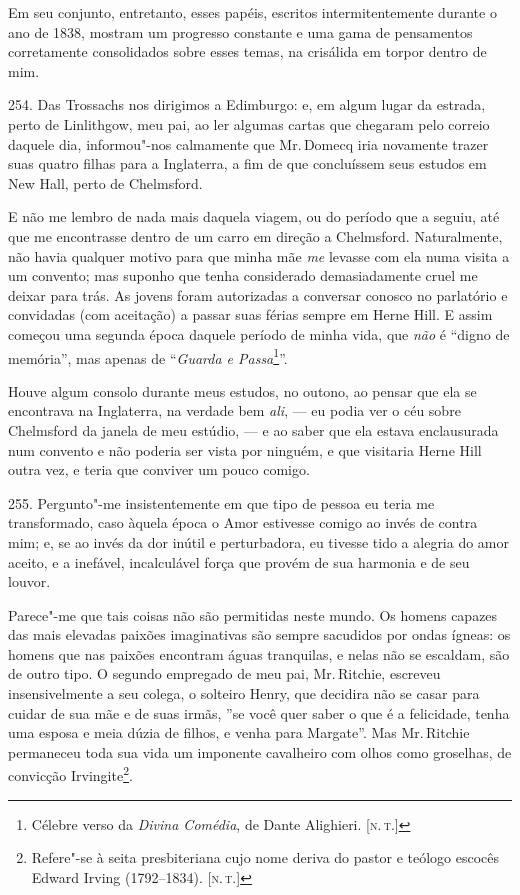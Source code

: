 Em seu conjunto, entretanto, esses papéis, escritos intermitentemente
durante o ano de 1838, mostram um progresso constante e uma gama de
pensamentos corretamente consolidados sobre esses temas, na crisálida em
torpor dentro de mim.

254. Das Trossachs nos dirigimos a Edimburgo: e, em algum lugar da
estrada, perto de Linlithgow, meu pai, ao ler algumas cartas que
chegaram pelo correio daquele dia, informou"-nos calmamente que Mr.\,Domecq
iria novamente trazer suas quatro filhas para a Inglaterra, a fim de que
concluíssem seus estudos em New Hall, perto de Chelmsford.

E não me lembro de nada mais daquela viagem, ou do período que a seguiu,
até que me encontrasse dentro de um carro em direção a Chelmsford.
Naturalmente, não havia qualquer motivo para que minha mãe \emph{me}
levasse com ela numa visita a um convento; mas suponho que tenha
considerado demasiadamente cruel me deixar para trás. As jovens foram
autorizadas a conversar conosco no parlatório e convidadas (com
aceitação) a passar suas férias sempre em Herne Hill. E assim começou
uma segunda época daquele período de minha vida, que \emph{não} é
``digno de memória'', mas apenas de ``\emph{Guarda e Passa}\footnote{Célebre
  verso da \emph{Divina Comédia}, de Dante Alighieri. {[}\textsc{n.\,t.}{]}}''.

Houve algum consolo durante meus estudos, no outono, ao pensar que ela
se encontrava na Inglaterra, na verdade bem \emph{ali}, --- eu podia ver
o céu sobre Chelmsford da janela de meu estúdio, --- e ao saber que ela
estava enclausurada num convento e não poderia ser vista por ninguém, e
que visitaria Herne Hill outra vez, e teria que conviver um pouco
comigo.

255. Pergunto"-me insistentemente em que tipo de pessoa eu teria me
transformado, caso àquela época o Amor estivesse comigo ao invés de
contra mim; e, se ao invés da dor inútil e perturbadora, eu tivesse tido
a alegria do amor aceito, e a inefável, incalculável força que provém de
sua harmonia e de seu louvor.

Parece"-me que tais coisas não são permitidas neste mundo. Os homens
capazes das mais elevadas paixões imaginativas são sempre sacudidos por
ondas ígneas: os homens que nas paixões encontram águas tranquilas, e
nelas não se escaldam, são de outro tipo. O segundo empregado de meu
pai, Mr.\,Ritchie, escreveu insensivelmente a seu colega, o solteiro
Henry, que decidira não se casar para cuidar de sua mãe e de suas irmãs,
''se você quer saber o que é a felicidade, tenha uma esposa e meia dúzia
de filhos, e venha para Margate''. Mas Mr.\,Ritchie permaneceu toda sua
vida um imponente cavalheiro com olhos como groselhas, de convicção
Irvingite\footnote{Refere"-se à seita presbiteriana cujo nome deriva do
  pastor e teólogo escocês Edward Irving (1792--1834). {[}\textsc{n.\,t.}{]}}.


